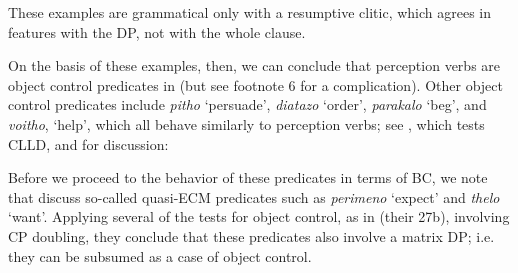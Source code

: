 \documentclass[output=paper]{langsci/langscibook}
\begin{document}
\ea%
    \label{ex:alexiadou:40}
    \z
\z  

These examples are grammatical only with a resumptive clitic, which agrees in features with the DP, not with the whole clause.{} 

On the basis of these examples, then, we can conclude that perception verbs are object control predicates in  (but see footnote 6 for a complication). Other object control predicates include \textit{pitho} ‘persuade’, \textit{diatazo} ‘order’, \textit{parakalo} ‘beg’, and \textit{voitho}, ‘help’, which all behave similarly to perception verbs; see , which tests CLLD, and \citet{Kotzoglou2002} for discussion:

    \z

Before we proceed to the behavior of these predicates in terms of BC, we note that \citet{Kotzoglou2007} discuss so-called quasi-ECM predicates such as \textit{perimeno} ‘expect’ and \textit{thelo} ‘want’. Applying several of the tests for object control, as in  (their 27b), involving CP doubling, they conclude that these predicates also involve a matrix DP; i.e. they can be subsumed as a case of object control. 
\end{document}
